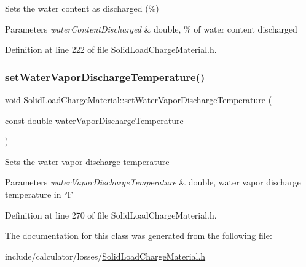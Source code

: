 Sets the water content as discharged (\%) 
\begin{DoxyParams}{Parameters}
{\em water\+Content\+Discharged} & double, \% of water content discharged \\
\hline
\end{DoxyParams}


Definition at line 222 of file Solid\+Load\+Charge\+Material.\+h.

\mbox{\label{class_solid_load_charge_material_af7837868e494c16aba5a2c3e1220106d}} 
\subsubsection{\texorpdfstring{set\+Water\+Vapor\+Discharge\+Temperature()}{setWaterVaporDischargeTemperature()}}
{\footnotesize\ttfamily void Solid\+Load\+Charge\+Material\+::set\+Water\+Vapor\+Discharge\+Temperature (\begin{DoxyParamCaption}\item[{const double}]{water\+Vapor\+Discharge\+Temperature }\end{DoxyParamCaption})\hspace{0.3cm}{\ttfamily [inline]}}

Sets the water vapor discharge temperature 
\begin{DoxyParams}{Parameters}
{\em water\+Vapor\+Discharge\+Temperature} & double, water vapor discharge temperature in °F \\
\hline
\end{DoxyParams}


Definition at line 270 of file Solid\+Load\+Charge\+Material.\+h.



The documentation for this class was generated from the following file\+:\begin{DoxyCompactItemize}
\item 
include/calculator/losses/\hyperlink{_solid_load_charge_material_8h}{Solid\+Load\+Charge\+Material.\+h}\end{DoxyCompactItemize}
